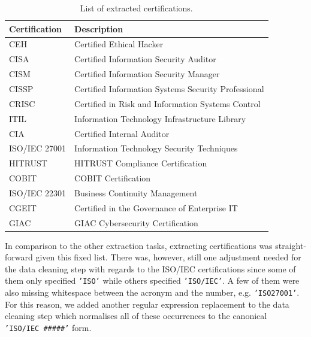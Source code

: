 \documentclass[runningheads]{llncs}
\begin{document}
\begin{table}[h]
	\centering
  \caption{List of extracted certifications.}
  \label{tab:certifications}

  \begin{tabular}{|l|l|}
    \hline
    \textbf{Certification} & \textbf{Description}                                \\ \hline
    CEH                    & Certified Ethical Hacker                            \\ \hline
    CISA                   & Certified Information Security Auditor              \\ \hline
    CISM                   & Certified Information Security Manager              \\ \hline
    CISSP                  & Certified Information Systems Security Professional \\ \hline
    CRISC                  & Certified in Risk and Information Systems Control   \\ \hline
    ITIL                   & Information Technology Infrastructure Library       \\ \hline
    CIA                    & Certified Internal Auditor                          \\ \hline
    ISO/IEC 27001          & Information Technology Security Techniques          \\ \hline
    HITRUST                & HITRUST Compliance Certification                    \\ \hline
    COBIT                  & COBIT Certification                                 \\ \hline
    ISO/IEC 22301          & Business Continuity Management                      \\ \hline
    CGEIT                  & Certified in the Governance of Enterprise IT        \\ \hline
    GIAC                   & GIAC Cybersecurity Certification                    \\ \hline
  \end{tabular}
\end{table}

In comparison to the other extraction tasks, extracting certifications was straight-forward given this fixed list. There was, however, still one adjustment needed for the data cleaning step with regards to the ISO/IEC certifications since some of them only specified \texttt{'ISO'} while others specified \texttt{'ISO/IEC'}. A few of them were also missing whitespace between the acronym and the number, e.g. \texttt{'ISO27001'}. For this reason, we added another regular expression replacement to the data cleaning step which normalises all of these occurrences to the canonical \texttt{'ISO/IEC~\#\#\#\#\#'} form.
\end{document}
